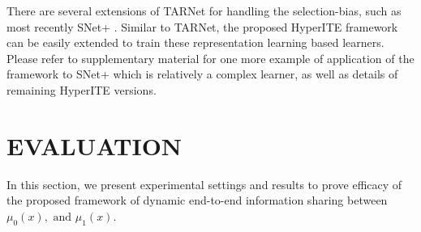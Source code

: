 \documentclass{article}
\begin{document}
There are several extensions of TARNet for handling the selection-bias, such as most recently SNet+ \cite{chauhan2023adversarial}. Similar to TARNet, the proposed HyperITE framework can be easily extended to train these representation learning based learners. Please refer to supplementary material for one more example of application of the framework to SNet+ which is relatively a complex learner, as well as details of remaining HyperITE versions.




\section{EVALUATION}
\label{sec_results}
In this section, we present experimental settings and results to prove efficacy of the proposed framework of dynamic end-to-end information sharing between $\mu_0(x), \text{ and } \mu_1(x)$.
\end{document}
